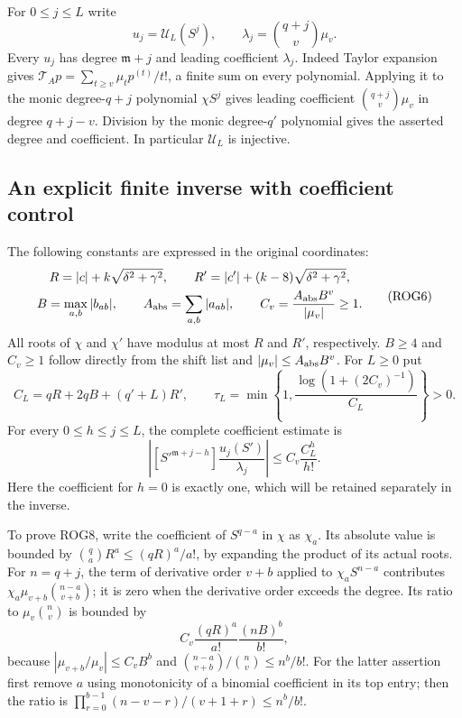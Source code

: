 \documentclass[11pt,a4paper]{article}
\begin{document}
For $0\le j\le L$ write
\[
 u_j=\mathcal U_L(S^j),\qquad
 \lambda_j=\binom{q+j}{v}\mu_v.
 \tag{ROG5}
\]
Every $u_j$ has degree $\mathfrak m+j$ and leading coefficient
$\lambda_j$. Indeed Taylor expansion gives
$\mathcal T_Ap=\sum_{t\ge v}\mu_t p^{(t)}/t!$, a finite sum
on every polynomial. Applying it to the monic degree-$q+j$
polynomial $\chi S^j$ gives leading coefficient
$\binom{q+j}{v}\mu_v$ in degree $q+j-v$. Division by the
monic degree-$q'$ polynomial gives the asserted degree and
coefficient. In particular $\mathcal U_L$ is injective.

\subsection{An explicit finite inverse with coefficient control}

The following constants are expressed in the original coordinates:
\[
 \begin{gathered}
 R=|c|+k\sqrt{\delta^2+\gamma^2},\qquad
 R'=|c'|+(k-8)\sqrt{\delta^2+\gamma^2},\\
 B=\max_{a,b}|b_{ab}|,\qquad A_{\rm abs}=\sum_{a,b}|a_{ab}|,
 \qquad C_v=\frac{A_{\rm abs}B^v}{|\mu_v|}\ge1.
 \end{gathered}\tag{ROG6}
\]
All roots of $\chi$ and $\chi'$ have modulus at most $R$ and
$R'$, respectively. $B\ge4$ and $C_v\ge1$ follow directly
from the shift list and $|\mu_v|\le A_{\rm abs}B^v$.
For $L\ge0$ put
\[
 C_L=qR+2qB+(q'+L)R',\qquad
 \tau_L=\min\left\{1,\frac{\log(1+(2C_v)^{-1})}{C_L}\right\}>0.
 \tag{ROG7}
\]
For every $0\le h\le j\le L$, the complete coefficient estimate is
\[
 \left|[S'^{\mathfrak m+j-h}]\frac{u_j(S')}{\lambda_j}\right|
 \le C_v\frac{C_L^h}{h!}.
 \tag{ROG8}
\]
Here the coefficient for $h=0$ is exactly one, which will be
retained separately in the inverse.

To prove ROG8, write the coefficient of $S^{q-a}$ in $\chi$
as $\chi_a$. Its absolute value is bounded by
$\binom qa R^a\le(qR)^a/a!$, by expanding the product of
its actual roots. For $n=q+j$, the term of derivative order
$v+b$ applied to $\chi_aS^{n-a}$ contributes
$\chi_a\mu_{v+b}\binom{n-a}{v+b}$; it is zero when the
derivative order exceeds the degree. Its ratio to
$\mu_v\binom nv$ is bounded by
\[
 C_v\frac{(qR)^a}{a!}\frac{(nB)^b}{b!},
 \tag{ROG9}
\]
because
$|\mu_{v+b}/\mu_v|\le C_vB^b$ and
$\binom{n-a}{v+b}/\binom nv\le n^b/b!$.
For the latter assertion first remove $a$ using monotonicity
of a binomial coefficient in its top entry; then the ratio is
$\prod_{r=0}^{b-1}(n-v-r)/(v+1+r)\le n^b/b!$.
\end{document}
